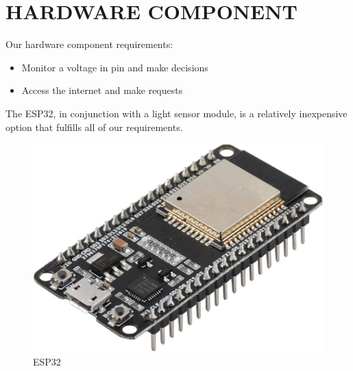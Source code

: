 \documentclass{article}
\begin{document}
\section{HARDWARE COMPONENT}
\begin{flushleft}
  Our hardware component requirements:
  \begin{itemize}
    \item Monitor a voltage in pin and make decisions
    \item Access the internet and make requests
  \end{itemize}
  The ESP32, in conjunction with a light sensor module, is a relatively inexpensive option that fulfills all of our requirements.\break
\begin{figure}[H]
        \centering
        \begin{minipage}{.4\textwidth}
                        \centering
                        \includegraphics[height=1\linewidth]{./media/ESP32.jpg}
                        \caption{ESP32}
        \end{minipage}\hfill
        \centering
        \begin{minipage}{.4\textwidth}
                        \centering

\end{minipage}
\end{figure}
\end{flushleft}
\end{document}
